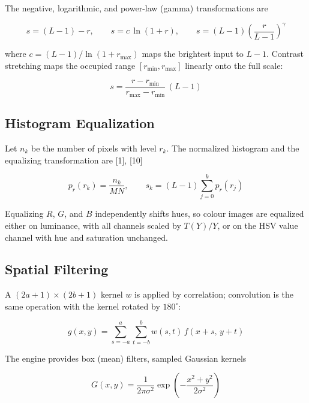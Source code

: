 \documentclass[journal]{IEEEtran}
\begin{document}
The negative, logarithmic, and power-law (gamma) transformations are

\begin{equation}
  s = (L-1) - r, \qquad s = c\,\ln(1+r), \qquad s = (L-1)\left(\frac{r}{L-1}\right)^{\gamma}
  \label{eq:point}
\end{equation}

where $c = (L-1)/\ln(1+r_{\max})$ maps the brightest input to $L-1$. Contrast stretching maps the occupied range $[r_{\min}, r_{\max}]$ linearly onto the full scale:

\begin{equation}
  s = \frac{r - r_{\min}}{r_{\max} - r_{\min}}\,(L-1)
  \label{eq:stretch}
\end{equation}

\subsection{Histogram Equalization}
Let $n_k$ be the number of pixels with level $r_k$. The normalized histogram and the equalizing transformation are [1], [10]

\begin{equation}
  p_r(r_k) = \frac{n_k}{MN}, \qquad s_k = (L-1)\sum_{j=0}^{k} p_r(r_j)
  \label{eq:he}
\end{equation}

Equalizing $R$, $G$, and $B$ independently shifts hues, so colour images are equalized either on luminance, with all channels scaled by $T(Y)/Y$, or on the HSV value channel with hue and saturation unchanged.

\subsection{Spatial Filtering}
A $(2a+1)\times(2b+1)$ kernel $w$ is applied by correlation; convolution is the same operation with the kernel rotated by $180^{\circ}$:

\begin{equation}
  g(x, y) = \sum_{s=-a}^{a}\sum_{t=-b}^{b} w(s, t)\, f(x+s,\, y+t)
  \label{eq:corr}
\end{equation}

The engine provides box (mean) filters, sampled Gaussian kernels

\begin{equation}
  G(x, y) = \frac{1}{2\pi\sigma^{2}} \exp\!\left(-\frac{x^{2}+y^{2}}{2\sigma^{2}}\right)
  \label{eq:gauss}
\end{equation}
\end{document}
